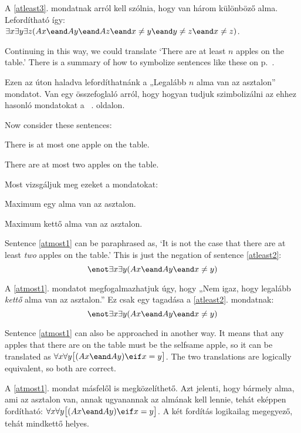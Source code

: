 A \ref{atleast3}. mondatnak arról kell szólnia, hogy van három különböző alma. Lefordítható így: $\exists x \exists y\exists z(Ax \eand Ay \eand Az \eand x\neq y \eand y\neq z \eand x \neq z)$.

Continuing in this way, we could translate `There are at least $n$ apples on the table.' There is a summary of how to symbolize sentences like these on p.~\pageref{summary.atleast}.

Ezen az úton haladva lefordíthatnánk a „Legalább $n$ alma van az asztalon” mondatot. Van egy összefoglaló arról, hogy hogyan tudjuk szimbolizálni az ehhez hasonló mondatokat a ~\pageref{summary.atleast}. oldalon.


Now consider these sentences:
\begin{earg}
\item[\ex{atmost1}] There is at most one apple on the table.
\item[\ex{atmost2}] There are at most two apples on the table.
\end{earg}


Most vizsgáljuk meg ezeket a mondatokat:
\begin{earg}
\item[\ex{atmost1}] Maximum egy alma van az asztalon.
\item[\ex{atmost2}] Maximum kettő alma van az asztalon.
\end{earg}

Sentence \ref{atmost1} can be paraphrased as, `It is not the case that there are at least \emph{two} apples on the table.' This is just the negation of sentence \ref{atleast2}: $$\enot \exists x \exists y(Ax \eand Ay \eand x\neq y)$$

A \ref{atmost1}. mondatot megfogalmazhatjuk úgy, hogy „Nem igaz, hogy legalább \emph{kettő} alma van az asztalon.” Ez csak egy tagadása a \ref{atleast2}. mondatnak: $$\enot \exists x \exists y(Ax \eand Ay \eand x\neq y)$$



Sentence \ref{atmost1} can also be approached in another way. It means that any apples that there are on the table must be the selfsame apple, so it can be translated as $\forall x\forall y\bigl[(Ax \eand Ay) \eif x=y\bigr]$. The two translations are logically equivalent, so both are correct.

A \ref{atmost1}. mondat másfelől is megközelíthető. Azt jelenti, hogy bármely alma, ami az asztalon van, annak ugyanannak az almának kell lennie, tehát eképpen fordítható: $\forall x\forall y\bigl[(Ax \eand Ay) \eif x=y\bigr]$. A két fordítás logikailag megegyező, tehát mindkettő helyes.

